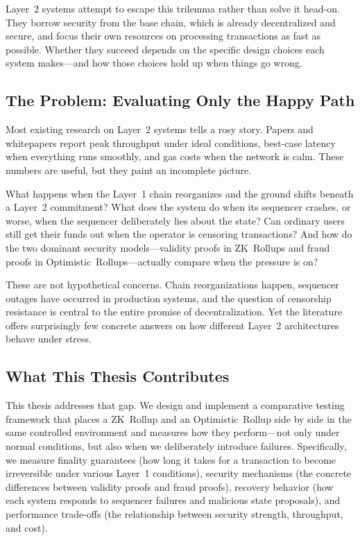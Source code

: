 \documentclass[
]{elteikthesis}[2024/04/26]
\begin{document}
Layer~2 systems attempt to escape this trilemma rather than solve it head-on. They borrow security from the base chain, which is already decentralized and secure, and focus their own resources on processing transactions as fast as possible. Whether they succeed depends on the specific design choices each system makes---and how those choices hold up when things go wrong.

\subsection{The Problem: Evaluating Only the Happy Path}

Most existing research on Layer~2 systems tells a rosy story. Papers and whitepapers report peak throughput under ideal conditions, best-case latency when everything runs smoothly, and gas costs when the network is calm. These numbers are useful, but they paint an incomplete picture.

What happens when the Layer~1 chain reorganizes and the ground shifts beneath a Layer~2 commitment? What does the system do when its sequencer crashes, or worse, when the sequencer deliberately lies about the state? Can ordinary users still get their funds out when the operator is censoring transactions? And how do the two dominant security models---validity proofs in ZK~Rollups and fraud proofs in Optimistic~Rollups---actually compare when the pressure is on?

These are not hypothetical concerns. Chain reorganizations happen, sequencer outages have occurred in production systems, and the question of censorship resistance is central to the entire promise of decentralization. Yet the literature offers surprisingly few concrete answers on how different Layer~2 architectures behave under stress.

\subsection{What This Thesis Contributes}

This thesis addresses that gap. We design and implement a comparative testing framework that places a ZK~Rollup and an Optimistic~Rollup side by side in the same controlled environment and measures how they perform---not only under normal conditions, but also when we deliberately introduce failures. Specifically, we measure finality guarantees (how long it takes for a transaction to become irreversible under various Layer~1 conditions), security mechanisms (the concrete differences between validity proofs and fraud proofs), recovery behavior (how each system responds to sequencer failures and malicious state proposals), and performance trade-offs (the relationship between security strength, throughput, and cost).
\end{document}

